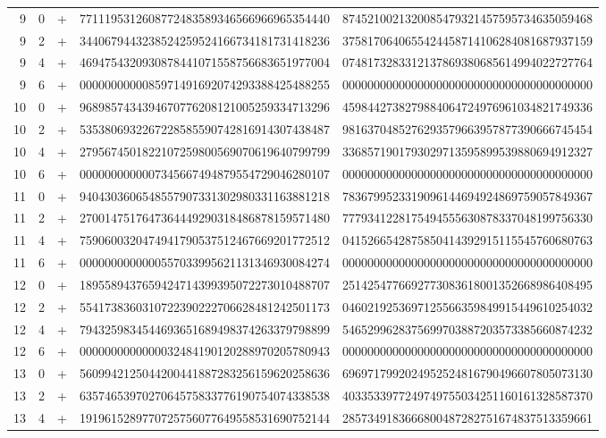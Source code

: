 \begin{longtable}{rrrll}
9 & 0 & + & 7711195312608772483589346566966965354440 & 8745210021320085479321457595734635059468 \\
9 & 2 & + & 3440679443238524259524166734181731418236 & 3758170640655424458714106284081687937159 \\
9 & 4 & + & 4694754320930878441071558756683651977004 & 0748173283312137869380685614994022727764 \\
9 & 6 & + & 0000000000085971491692074293388425488255 & 0000000000000000000000000000000000000000 \\
10 & 0 & + & 9689857434394670776208121005259334713296 & 4598442738279884064724976961034821749336 \\
10 & 2 & + & 5353806932267228585590742816914307438487 & 9816370485276293579663957877390666745454 \\
10 & 4 & + & 2795674501822107259800569070619640799799 & 3368571901793029713595899539880694912327 \\
10 & 6 & + & 0000000000007345667494879554729046280107 & 0000000000000000000000000000000000000000 \\
11 & 0 & + & 9404303606548557907331302980331163881218 & 7836799523319096144694924869759057849367 \\
11 & 2 & + & 2700147517647364449290318486878159571480 & 7779341228175494555630878337048199756330 \\
11 & 4 & + & 7590600320474941790537512467669201772512 & 0415266542875850414392915115545760680763 \\
11 & 6 & + & 0000000000000557033995621131346930084274 & 0000000000000000000000000000000000000000 \\
12 & 0 & + & 1895589437659424714399395072273010488707 & 2514254776692773083618001352668986408495 \\
12 & 2 & + & 5541738360310722390222706628481242501173 & 0460219253697125566359849915449610254032 \\
12 & 4 & + & 7943259834544693651689498374263379798899 & 5465299628375699703887203573385660874232 \\
12 & 6 & + & 0000000000000032484190120288970205780943 & 0000000000000000000000000000000000000000 \\
13 & 0 & + & 5609942125044200441887283256159620258636 & 6969717992024952524816790496607805073130 \\
13 & 2 & + & 6357465397027064575833776190754074338538 & 4033533977249749755034251160161328587370 \\
13 & 4 & + & 1919615289770725756077649558531690752144 & 2857349183666800487282751674837513359661 \\

\end{longtable}
